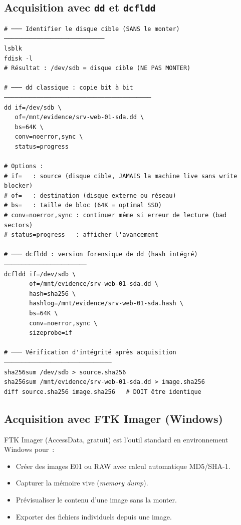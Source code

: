 \subsection{Acquisition avec \texttt{dd} et \texttt{dcfldd}}

\begin{lstlisting}[style=StyleTerminal,
  caption={Acquisition forensique Linux --- dd et dcfldd},
  label={lst:dd-acquisition}]
# ─── Identifier le disque cible (SANS le monter) ────────────────────────────
lsblk
fdisk -l
# Résultat : /dev/sdb = disque cible (NE PAS MONTER)

# ─── dd classique : copie bit à bit ─────────────────────────────────────────
dd if=/dev/sdb \
   of=/mnt/evidence/srv-web-01-sda.dd \
   bs=64K \
   conv=noerror,sync \
   status=progress

# Options :
# if=   : source (disque cible, JAMAIS la machine live sans write blocker)
# of=   : destination (disque externe ou réseau)
# bs=   : taille de bloc (64K = optimal SSD)
# conv=noerror,sync : continuer même si erreur de lecture (bad sectors)
# status=progress   : afficher l'avancement

# ─── dcfldd : version forensique de dd (hash intégré) ───────────────────────
dcfldd if=/dev/sdb \
       of=/mnt/evidence/srv-web-01-sda.dd \
       hash=sha256 \
       hashlog=/mnt/evidence/srv-web-01-sda.hash \
       bs=64K \
       conv=noerror,sync \
       sizeprobe=if

# ─── Vérification d'intégrité après acquisition ──────────────────────────────
sha256sum /dev/sdb > source.sha256
sha256sum /mnt/evidence/srv-web-01-sda.dd > image.sha256
diff source.sha256 image.sha256   # DOIT être identique
\end{lstlisting}

\subsection{Acquisition avec FTK Imager (Windows)}

FTK Imager (AccessData, gratuit) est l'outil standard en environnement
Windows pour~:
\begin{itemize}
  \item Créer des images E01 ou RAW avec calcul automatique MD5/SHA-1.
  \item Capturer la mémoire vive (\textit{memory dump}).
  \item Prévisualiser le contenu d'une image sans la monter.
  \item Exporter des fichiers individuels depuis une image.
\end{itemize}

